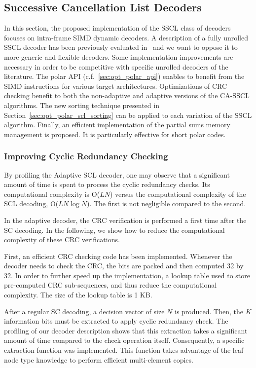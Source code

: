 \subsection{Successive Cancellation List Decoders}
\label{sec:opt_polar_scl}

In this section, the proposed implementation of the SSCL class of decoders
focuses on intra-frame SIMD dynamic decoders. A description of a fully unrolled
SSCL decoder has been previously evaluated in~\cite{Sarkis2016} and we want to
oppose it to more generic and flexible decoders. Some implementation
improvements are necessary in order to be competitive with specific unrolled
decoders of the literature. The polar API (c.f.~\ref{sec:opt_polar_api}) enables
to benefit from the SIMD instructions for various target architectures.
Optimizations of CRC checking benefit to both the non-adaptive and adaptive
versions of the CA-SSCL algorithms. The new sorting technique presented in
Section~\ref{sec:opt_polar_scl_sorting} can be applied to each variation of the
SSCL algorithm. Finally, an efficient implementation of the partial sums memory
management is proposed. It is particularly effective for short polar codes.

\subsubsection{Improving Cyclic Redundancy Checking}
\label{sec:opt_polar_scl_crc}

By profiling the Adaptive SCL decoder, one may observe that a significant amount
of time is spent to process the cyclic redundancy checks. Its computational
complexity is O($LN$) versus the computational complexity of the SCL decoding,
O($LN\log N$). The first is not negligible compared to the second.

In the adaptive decoder, the CRC verification is performed a first time after
the SC decoding. In the following, we show how to reduce the computational
complexity of these CRC verifications.

First, an efficient CRC checking code has been implemented. Whenever the decoder
needs to check the CRC, the bits are packed and then computed 32 by 32. In order
to further speed up the implementation, a lookup table used to store
pre-computed CRC sub-sequences, and thus reduce the computational complexity.
The size of the lookup table is 1 KB.

After a regular SC decoding, a decision vector of size $N$ is produced. Then,
the $K$ information bits must be extracted to apply cyclic redundancy check. The
profiling of our decoder description shows that this extraction takes a
significant amount of time compared to the check operation itself. Consequently,
a specific extraction function was implemented. This function takes advantage of
the leaf node type knowledge to perform efficient multi-element copies.

